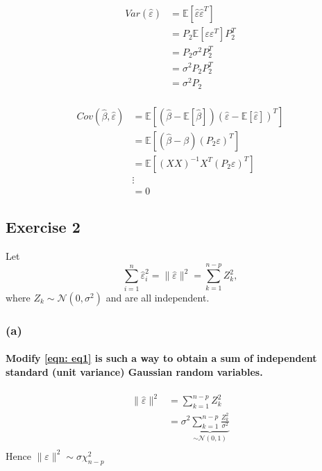 \documentclass{article}
\newcommand{\E}{\mathbb{E}}
\begin{document}
    \begin{align*}
        Var(\hat \varepsilon)
         & = \E \left[\hat \varepsilon \hat \varepsilon^T\right] \\
         & = P_2 \E \left[\varepsilon \varepsilon^T\right] P_2^T \\
         & = P_2 \sigma^2 P_2^T                                  \\
         & =\sigma^2 P_2 P_2^T                                   \\
         & =\sigma^2 P_2                                         \\
    \end{align*}


    \begin{align*}
        Cov(\hat \beta, \hat \varepsilon)
         & = \E\left[ \left(\hat \beta - \E \left[\hat \beta \right]\right) \left(\hat \varepsilon - \E \left[\hat \varepsilon \right]\right)^T\right] \\
         & = \E\left[ \left(\hat \beta - \beta\right) \left( P_2 \varepsilon\right)^T\right]                                                           \\
         & = \E\left[ \left( X X \right)^{-1} X^T \left( P_2 \varepsilon\right)^T\right]                                                               \\
         & \vdots                                                                                                                                      \\
         & = 0
    \end{align*}

    \subsection{Exercise 2}

    Let
    \begin{equation}
        \label{eqn: eq1}
        \sum_{i=1}^{n} \hat{\varepsilon}_{i}^{2}=\|\hat{\varepsilon}\|^{2}=\sum_{k=1}^{n-p} Z_{k}^{2},
    \end{equation}
    where $Z_{k} \sim \mathcal{N}\left(0, \sigma^{2}\right)$ and are all independent.

\subsubsection{(a)}
\paragraph{Modify \eqref{eqn: eq1} is such a way to obtain a sum of independent standard (unit variance) Gaussian random variables.}

\begin{align*}
    \|\hat \varepsilon\|^2
     & = \sum_{k=1}^{n-p} Z_k^2 \\
     & = \sigma^2 \underbrace{\sum_{k=1}^{n-p} \frac{Z_k^2}{\sigma^2}}_{\sim \mathcal{N}(0, 1)} \\
\end{align*}
Hence \( \| \varepsilon \|^2 \sim \sigma \chi^2_{n-p} \)
\end{document}
